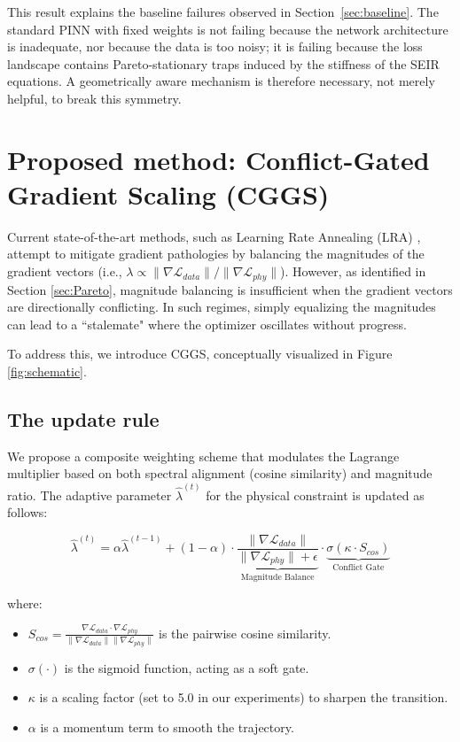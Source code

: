 \documentclass[11pt]{article}
\begin{document}
This result explains the baseline failures observed in Section~\ref{sec:baseline}. The standard PINN with fixed weights is not failing because the network architecture is inadequate, nor because the data is too noisy; it is failing because the loss landscape contains Pareto-stationary traps induced by the stiffness of the SEIR equations. A geometrically aware mechanism is therefore necessary, not merely helpful, to break this symmetry.


\section{Proposed method: Conflict-Gated Gradient Scaling (CGGS)}

Current state-of-the-art methods, such as Learning Rate Annealing (LRA) \cite{wang2021understanding}, attempt to mitigate gradient pathologies by balancing the magnitudes of the gradient vectors (i.e., $\lambda \propto \|\nabla \mathcal{L}_{data}\|/\|\nabla \mathcal{L}_{phy}\|$). However, as identified in Section \ref{sec:Pareto}, magnitude balancing is insufficient when the gradient vectors are directionally conflicting. In such regimes, simply equalizing the magnitudes can lead to a ``stalemate" where the optimizer oscillates without progress.

To address this, we introduce CGGS, conceptually visualized in Figure \ref{fig:schematic}.

\subsection{The update rule}\label{sec:update_rule}
We propose a composite weighting scheme that modulates the Lagrange multiplier based on both spectral alignment (cosine similarity) and magnitude ratio. The adaptive parameter $\hat{\lambda}^{(t)}$ for the physical constraint is updated as follows:

\begin{equation}\label{eq:cggs_update}
    \hat{\lambda}^{(t)} = \alpha \hat{\lambda}^{(t-1)} + (1-\alpha) \cdot \underbrace{\frac{\|\nabla \mathcal{L}_{data}\|}{\|\nabla \mathcal{L}_{phy}\| + \epsilon}}_{\text{Magnitude Balance}} \cdot \underbrace{\sigma(\kappa \cdot S_{cos})}_{\text{Conflict Gate}}
\end{equation}

where:
\begin{itemize}
    \item $S_{cos} = \frac{\nabla \mathcal{L}_{data} \cdot \nabla \mathcal{L}_{phy}}{\|\nabla \mathcal{L}_{data}\| \|\nabla \mathcal{L}_{phy}\|}$ is the pairwise cosine similarity.
    \item $\sigma(\cdot)$ is the sigmoid function, acting as a soft gate.
    \item $\kappa$ is a scaling factor (set to 5.0 in our experiments) to sharpen the transition.
    \item $\alpha$ is a momentum term to smooth the trajectory.
\end{itemize}
\end{document}

